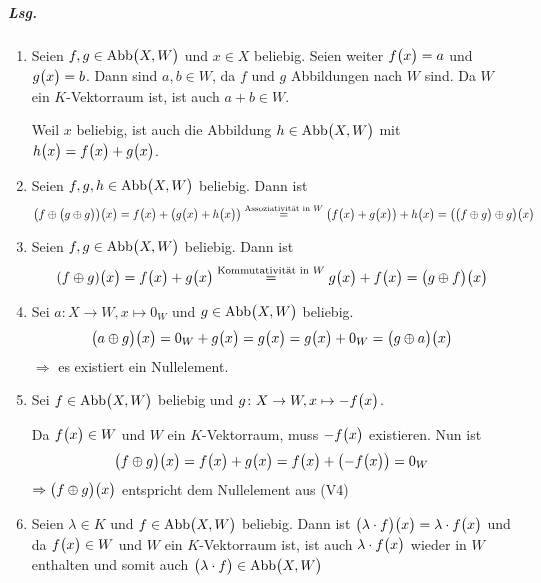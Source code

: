 \documentclass{scrreprt}
\begin{document}
\subparagraph{Lsg.}
\begin{enumerate}[(V1)]
\item Seien $f, g \in \text{Abb}\qty\big(X, W)$ und $x \in X$ beliebig.
  Seien weiter $f\qty\big(x) = a$ und $g\qty\big(x) = b$.
  Dann sind $a, b \in W$, da $f$ und $g$ Abbildungen nach $W$ sind.
  Da $W$ ein $K$-Vektorraum ist, ist auch $a + b \in W$.

  Weil $x$ beliebig, ist auch die Abbildung $h \in \text{Abb}\qty\big(X, W)$ mit
  $h\qty\big(x) = f\qty\big(x) + g\qty\big(x)$.

\item Seien $f, g, h \in \text{Abb}\qty\big(X, W)$ beliebig.
  Dann ist
  \[
    \qty(f \oplus \qty\big(g \oplus g))\qty\big(x) = f\qty\big(x) + \qty(g\qty\big(x) + h\qty\big(x))
    \overset{\text{Assoziativität in $W$}} = \qty\big(f\qty\big(x) + g\qty\big(x)) + h\qty\big(x) =
    \qty(\qty\big(f \oplus g) \oplus g)\qty\big(x)
  \]

\item Seien $f, g \in \text{Abb}\qty\big(X, W)$ beliebig.
  Dann ist
  \[
    \qty(f \oplus g)\qty\big(x) = f\qty\big(x) + g\qty\big(x)
    \overset{\text{Kommutativität in $W$}} = g\qty\big(x) + f\qty\big(x) =
    \qty\big(g \oplus f)\qty\big(x)
  \]

\item Sei $a \colon X \to W, x \mapsto 0_W$ und $g \in \text{Abb}\qty\big(X, W)$
  beliebig.
  \[
    \qty\big(a \oplus g)\qty\big(x) = 0_W + g\qty\big(x) = g\qty\big(x)
    = g\qty\big(x) + 0_W = \qty\big(g \oplus a)\qty\big(x)
  \]
  $\Rightarrow$ es existiert ein Nullelement.

\item Sei $f \in \text{Abb}\qty\big(X, W)$ beliebig und
  $g \colon X \to W, x \mapsto -f\qty\big(x)$.

  Da $f\qty\big(x) \in W$ und $W$ ein $K$-Vektorraum, muss
  $-f\qty\big(x)$ existieren.
  Nun ist \[
    \qty\big(f \oplus g)\qty\big(x) = f\qty\big(x) + g\qty\big(x)
    = f\qty\big(x) + \qty(-f\qty\big(x))
    = 0_W
  \]
  $\Rightarrow \qty\big(f \oplus g)\qty\big(x)$ entspricht dem Nullelement aus (V4)

\item Seien $\lambda \in K$ und $f \in \text{Abb}\qty\big(X, W)$ beliebig.
  Dann ist $\qty\big(\lambda \cdot f)\qty\big(x) = \lambda \cdot f\qty\big(x)$
  und da $f\qty\big(x) \in W$ und $W$ ein $K$-Vektorraum ist, ist auch
  $\lambda \cdot f\qty\big(x)$ wieder in $W$ enthalten und somit auch
  $\qty\big(\lambda \cdot f) \in \text{Abb}\qty\big(X, W)$


\end{enumerate}
\end{document}
